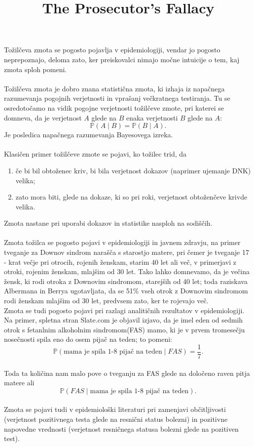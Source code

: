 \documentclass[a4paper,12pt]{article}
\begin{document}
\title{The Prosecutor's Fallacy}
\maketitle

Tožilčeva zmota se pogosto pojavlja v epidemiologiji, vendar jo pogosto neprepoznajo, deloma zato, ker preiskovalci nimajo močne intuicije 
o tem, kaj zmota sploh pomeni. \\
\\
Tožilčeva zmota je dobro znana statistična zmota, ki izhaja iz napačnega razumevanja pogojnih verjetnosti in vprašanj večkratnega testiranja. 
Tu se osredotočamo na vidik pogojne verjetnosti tožilčeve zmote, pri katerei se domneva, da je verjetnost $A$ glede na $B$ enaka verjetnosti 
$B$ glede na $A$:
$$ \mathbb{P}(A \mid B) = \mathbb{P}(B \mid A). $$
Je posledica napačnega razumevanja Bayesovega izreka. \\
\\
Klasičen primer tožilčeve zmote se pojavi, ko tožilec trid, da
\begin{enumerate}
    \item če bi bil obtoženec kriv, bi bila verjetnost dokazov (naprimer ujemanje DNK) velika;
    \item zato mora biti, glede na dokaze, ki so pri roki, verjetnost obtoženčeve krivde velika.
\end{enumerate}
Zmota nastane pri uporabi dokazov in statistike nasploh na sodiščih.
\\
\\
Zmota tožilca se pogosto pojavi v epidemiologiji in javnem zdravju, na primer tveganje za Downov sindrom narašča s starostjo matere, pri čemer je 
tveganje 17 - krat večje pri otrocih, rojenih ženskam, starim 40 let ali več, v primerjavi z otroki, rojenim ženskam, mlajšim od 30 let. Tako lahko 
domnevamo, da je večina žensk, ki rodi otroka z Downovim sindromom, starejših od 40 let; toda raziskava Albermana in Berrya ugotavljata, da se 51\% vseh 
otrok z Downovim sindromom rodi ženskam mlajšim od 30 let, predvsem zato, ker te rojevajo več. \\
Zmota se tudi pogosto pojavi pri razlagi analitičnih rezultatov v epidemiologiji. Na primer, spletna stran Slate.com je objavil izjavo, da je imel eden od 
sedmih otrok s fetanlnim alkoholnim sindromom(FAS) mamo, ki je v prvem tromesečju nosečnosti spila eno do osem pijač na teden; to pomeni: \\
\[ \mathbb{P}(\text{mama je spila 1-8 pijač na teden} \mid FAS) = \frac{1}{7}.\] \\
Toda ta količina nam malo pove o tveganju za FAS glede na določeno raven pitja matere ali \\
\[\mathbb{P}(FAS \mid \text{mama je spila 1-8 pijač na teden}).\]
\\
Zmota se pojavi tudi v epidemiološki literaturi pri zamenjavi občitljivosti (verjetnost pozitivnega testa glede na resnični status bolezni) in pozitivne 
napovedne vrednosti (verjetnost resničnega statusa bolezni glede na pozitiven test).
\end{document}
